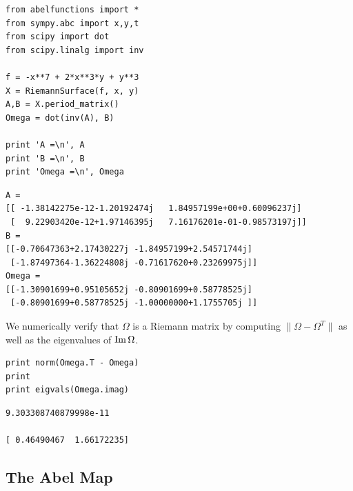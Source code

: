 \begin{lstlisting}
from abelfunctions import *
from sympy.abc import x,y,t
from scipy import dot
from scipy.linalg import inv

f = -x**7 + 2*x**3*y + y**3
X = RiemannSurface(f, x, y)
A,B = X.period_matrix()
Omega = dot(inv(A), B)

print 'A =\n', A
print 'B =\n', B
print 'Omega =\n', Omega
\end{lstlisting}
\begin{lstlisting}
A =
[[ -1.38142275e-12-1.20192474j   1.84957199e+00+0.60096237j]
 [  9.22903420e-12+1.97146395j   7.16176201e-01-0.98573197j]]
B =
[[-0.70647363+2.17430227j -1.84957199+2.54571744j]
 [-1.87497364-1.36224808j -0.71617620+0.23269975j]]
Omega =
[[-1.30901699+0.95105652j -0.80901699+0.58778525j]
 [-0.80901699+0.58778525j -1.00000000+1.1755705j ]]
\end{lstlisting}
We numerically verify that $\Omega$ is a Riemann matrix by computing $\|\Omega -
\Omega^T\|$ as well as the eigenvalues of $\operatorname{\text{Im}} \Omega$.
\begin{lstlisting}[firstnumber=14]
print norm(Omega.T - Omega)
print
print eigvals(Omega.imag)
\end{lstlisting}
\begin{lstlisting}
9.303308740879998e-11

[ 0.46490467  1.66172235]
\end{lstlisting}


\subsection{The Abel Map}\label{subsec:background-the-abel-map}

